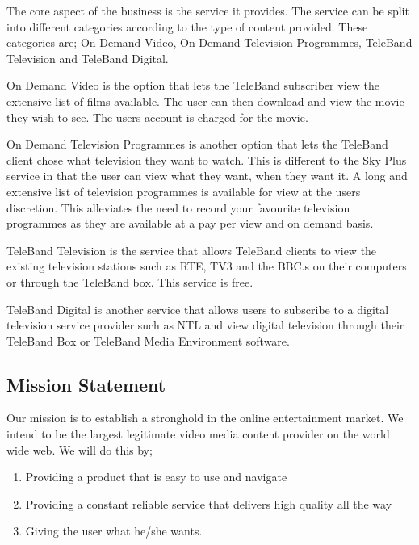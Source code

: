\documentclass[a4paper,12pt]{article}
\begin{document}
The core aspect of the business is the service it provides. The service
can be split into different categories according to the type of content
provided. These categories are; On Demand Video, On Demand Television
Programmes, TeleBand Television and TeleBand Digital. 


On Demand Video is the option that lets the TeleBand subscriber view the
extensive list of films available. The user can then download and view
the movie they wish to see. The users account is charged for the movie.


On Demand Television Programmes is another option that lets the TeleBand
client chose what television they want to watch. This is different to
the Sky Plus service in that the user can view what they want, when they
want it. A long and extensive list of television programmes is available
for view at the users discretion. This alleviates the need to record
your favourite television programmes as they are available at a pay per
view and on demand basis.


TeleBand Television is the service that allows TeleBand clients to view
the existing television stations such as RTE, TV3 and the BBC.s on their
computers or through the TeleBand box. This service is free.


TeleBand Digital is another service that allows users to subscribe to a
digital television service provider such as NTL and view digital
television through their TeleBand Box or TeleBand Media Environment
software.


\subsection{Mission Statement}

Our mission is to establish a stronghold in the online entertainment
market. We intend to be the largest legitimate video media content
provider on the world wide web. We will do this by;

\begin{enumerate}

\item	Providing a product that is easy to use and navigate

\item	Providing a constant reliable service that delivers 
		high quality all the way

\item	Giving the user what he/she wants.
\end{enumerate}
\end{document}
